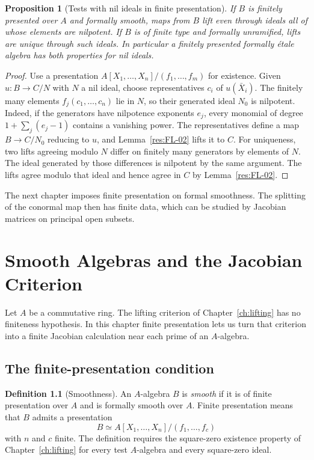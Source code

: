 \documentclass[11pt,oneside,openany]{book}
\newtheorem{proposition}[theorem]{Proposition}
\theoremstyle{definition}
\newtheorem{definition}[theorem]{Definition}
\theoremstyle{remark}
\begin{document}
\begin{proposition}[Tests with nil ideals in finite presentation]
\label{res:FL-18}
If $B$ is finitely presented over $A$ and formally smooth, maps from $B$
lift even through ideals all of whose elements are nilpotent. If $B$ is
of finite type and formally unramified, lifts are unique through such ideals.
In particular a finitely presented formally \'{e}tale algebra has both
properties for nil ideals.
\end{proposition}
\begin{proof}
Use a presentation $A[X_1,\ldots,X_n]/(f_1,\ldots,f_m)$ for existence.
Given $u:B\to C/N$ with $N$ a nil ideal, choose representatives $c_i$
of $u(\bar X_i)$. The finitely many elements $f_j(c_1,\ldots,c_n)$ lie in
$N$, so their generated ideal $N_0$ is nilpotent. Indeed, if the
generators have nilpotence exponents $e_j$, every monomial of degree
$1+\sum_j(e_j-1)$ contains a vanishing power. The representatives define
a map $B\to C/N_0$ reducing to $u$, and Lemma~\ref{res:FL-02} lifts it to $C$.
For uniqueness, two lifts agreeing modulo $N$ differ on finitely many
generators by elements of $N$. The ideal generated by those differences
is nilpotent by the same argument. The lifts agree modulo that ideal and
hence agree in $C$ by Lemma~\ref{res:FL-02}.
\end{proof}

The next chapter imposes finite presentation on formal smoothness. The
splitting of the conormal map then has finite data, which can be studied by
Jacobian matrices on principal open subsets.
\chapter{Smooth Algebras and the Jacobian Criterion}
\label{ch:smooth}

Let $A$ be a commutative ring. The lifting criterion of
Chapter~\ref{ch:lifting} has no finiteness hypothesis. In this chapter
finite presentation lets us turn that criterion into a finite
Jacobian calculation near each prime of an $A$-algebra.

\section{The finite-presentation condition}

\begin{definition}[Smoothness]
\label{res:SM-01}
An $A$-algebra $B$ is \emph{smooth} if it is of finite presentation
over $A$ and is formally smooth over $A$. Finite presentation means
that $B$ admits a presentation
\[
  B \simeq A[X_1,\ldots,X_n]/(f_1,\ldots,f_c)
\]
with $n$ and $c$ finite. The definition requires the square-zero
existence property of Chapter~\ref{ch:lifting} for every test
$A$-algebra and every square-zero ideal.
\end{definition}
\end{document}
